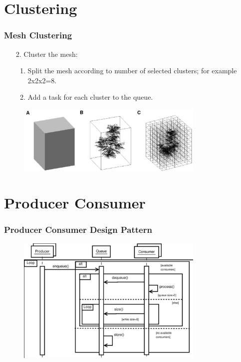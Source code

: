 \documentclass[
	10pt,
	t		%
]{beamer}
\begin{document}
\section{Clustering}
\begin{frame}
\frametitle{Mesh Clustering}
\begin{enumerate}
\item [2.] Cluster the mesh:
\begin{enumerate}
\item Split the mesh according to number of selected clusters; for example 2x2x2=8.
\item Add a task for each cluster to the queue.
\end{enumerate}
\end{enumerate}
\begin{figure}[ht]
\centering
\includegraphics[width=0.8\textwidth]{clustering}
\end{figure}
\end{frame}

\section{Producer Consumer}
\begin{frame}
\frametitle{Producer Consumer Design Pattern}
\begin{figure}[ht]
\centering
\includegraphics[width=0.8\textwidth]{producer_consumer}
\end{figure}
\end{frame}
\end{document}
